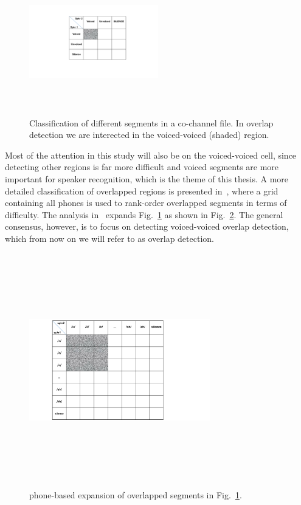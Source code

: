 \begin{figure}[h!]
	\centering
	\includegraphics[height = 2.5in, width=0.5\textwidth]{figures/morgan_v_uv_table}
	\caption{ Classification of different segments in a co-channel file. In overlap detection we are interected in 
		the voiced-voiced (shaded) region.}
	\label{fig:ch2_morgan_v_uv_table}
\end{figure}

Most of the attention in this study will also be on the voiced-voiced cell, since detecting other regions is far more difficult and voiced segments are more important for speaker recognition, which is the theme of this thesis. 
A more detailed classification of overlapped regions is presented in~\cite{nav_icassp13}, where a grid containing all phones is used to rank-order overlapped segments in terms of difficulty. 
The analysis in~\cite{nav_icassp13} expands Fig.~\ref{fig:ch2_morgan_v_uv_table} as shown in Fig.~\ref{fig:ch2_nav_v_uv_table}. 
The general consensus, however, is to focus on detecting voiced-voiced overlap detection, which from now on we will refer to as overlap detection. 

\begin{figure}[h!]
	\centering
	\includegraphics[height = 4in, width=0.7\textwidth]{figures/nav_v_uv_table}	
	\caption{ phone-based expansion of overlapped segments in Fig.~\ref{fig:ch2_morgan_v_uv_table}.}
	\label{fig:ch2_nav_v_uv_table}
\end{figure}

